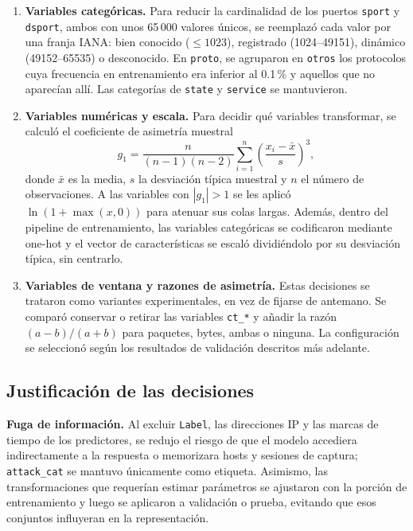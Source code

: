 \documentclass[conference]{IEEEtran}
\begin{document}
\begin{enumerate}
\item \textbf{Variables categóricas.} Para reducir la cardinalidad de los puertos \texttt{sport} y \texttt{dsport}, ambos con unos 65\,000 valores únicos, se reemplazó cada valor por una franja IANA: bien conocido ($\leq 1023$), registrado (1024--49151), dinámico (49152--65535) o desconocido. En \texttt{proto}, se agruparon en \texttt{otros} los protocolos cuya frecuencia en entrenamiento era inferior al 0.1\,\% y aquellos que no aparecían allí. Las categorías de \texttt{state} y \texttt{service} se mantuvieron.

\item \textbf{Variables numéricas y escala.} Para decidir qué variables transformar, se calculó el coeficiente de asimetría muestral
\begin{equation}
g_1 = \frac{n}{(n-1)(n-2)}
\sum_{i=1}^{n}\left(\frac{x_i-\bar{x}}{s}\right)^3,
\end{equation}
donde $\bar{x}$ es la media, $s$ la desviación típica muestral y $n$ el número de observaciones. A las variables con $|g_1|>1$ se les aplicó $\ln(1+\max(x,0))$ para atenuar sus colas largas. Además, dentro del pipeline de entrenamiento, las variables categóricas se codificaron mediante one-hot y el vector de características se escaló dividiéndolo por su desviación típica, sin centrarlo.

\item \textbf{Variables de ventana y razones de asimetría.} Estas decisiones se trataron como variantes experimentales, en vez de fijarse de antemano. Se comparó conservar o retirar las variables \texttt{ct\_*} y añadir la razón $(a-b)/(a+b)$ para paquetes, bytes, ambas o ninguna. La configuración se seleccionó según los resultados de validación descritos más adelante.

\end{enumerate}

\subsection{Justificación de las decisiones}

\textbf{Fuga de información.} Al excluir \texttt{Label}, las direcciones IP y las marcas de tiempo de los predictores, se redujo el riesgo de que el modelo accediera indirectamente a la respuesta o memorizara hosts y sesiones de captura; \texttt{attack\_cat} se mantuvo únicamente como etiqueta. Asimismo, las transformaciones que requerían estimar parámetros se ajustaron con la porción de entrenamiento y luego se aplicaron a validación o prueba, evitando que esos conjuntos influyeran en la representación.
\end{document}
